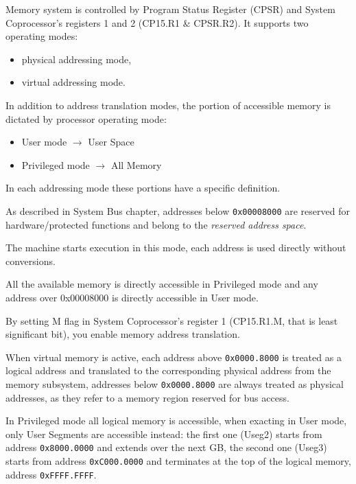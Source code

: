 Memory system is controlled by Program Status Register (CPSR) and System Coprocessor's registers 1 and 2 (CP15.R1 \& CPSR.R2). It supports two operating modes:

\begin{itemize}
\item physical addressing mode, 
\item virtual addressing mode.
\end{itemize}

In addition to address translation modes, the portion of accessible memory is dictated by processor operating mode:

\begin{itemize}
\item User mode $\rightarrow$ User Space
\item Privileged mode $\rightarrow$ All Memory
\end{itemize}

In each addressing mode these portions have a specific definition.

As described in System Bus chapter, addresses below \texttt{0x00008000} are reserved for hardware/protected functions and belong to the \emph{reserved address space}.

The machine starts execution in this mode, each address is used directly without conversions.

All the available memory is directly accessible in Privileged mode and any address over 0x00008000 is directly accessible in User mode.

\vspace{10px}



\label{sec:man:virtualMemory}
By setting M flag in System Coprocessor's register 1 (CP15.R1.M, that is least significant bit), you enable memory address translation.

When virtual memory is active, each address above \texttt{0x0000.8000} is treated as a logical address and translated to the corresponding physical address from the memory subsystem, addresses below \texttt{0x0000.8000} are always treated as physical addresses, as they refer to a memory region reserved for bus access.

In Privileged mode all logical memory is accessible, when exacting in User mode, only User Segments are accessible instead: the first one (Useg2) starts from address \texttt{0x8000.0000} and extends over the next GB, the second one (Useg3) starts from address \texttt{0xC000.0000} and terminates at the top of the logical memory, address \texttt{0xFFFF.FFFF}.

